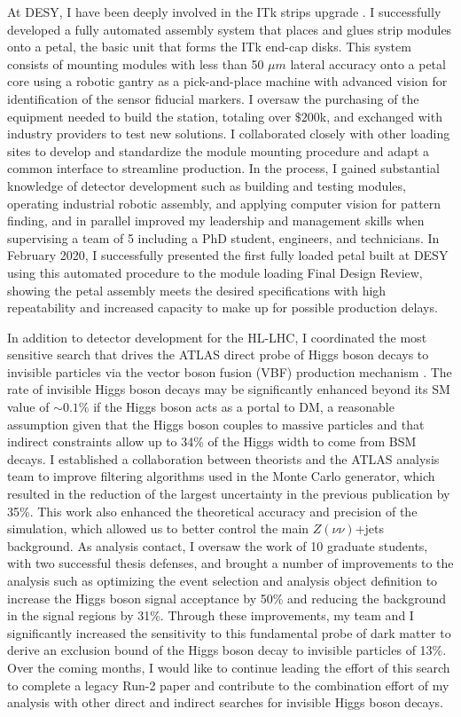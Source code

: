 \documentclass[a4paper]{article}
\begin{document}
At DESY, I have been deeply involved in the ITk strips upgrade \cite{ITKstrips}. I successfully developed a fully automated assembly system that places and glues strip modules onto a petal, the basic unit that forms the ITk end-cap disks. This system consists of mounting modules with less than 50 $\mu m$ lateral accuracy onto a petal core using a robotic gantry as a pick-and-place machine with advanced vision for identification of the sensor fiducial markers. I oversaw the purchasing of the equipment needed to build the station, totaling over $\$200$k, and exchanged with industry providers to test new solutions. I collaborated closely with other loading sites to develop and standardize the module mounting procedure and adapt a common interface to streamline production. In the process, I gained substantial knowledge of detector development such as building and testing modules, operating industrial robotic assembly, and applying computer vision for pattern finding, and in parallel improved my leadership and management skills when supervising a team of 5 including a PhD student, engineers, and technicians. In February 2020, I successfully presented the first fully loaded petal built at DESY using this automated procedure to the module loading Final Design Review, showing the petal assembly meets the desired specifications with high repeatability and increased capacity to make up for possible production delays.

\bigskip

In addition to detector development for the HL-LHC, I coordinated the most sensitive search that drives the ATLAS direct probe of Higgs boson decays to invisible particles via the vector boson fusion (VBF) production mechanism \cite{vbfMET_CONF2020}. The rate of invisible Higgs boson decays may be significantly enhanced beyond its SM value of $\sim0.1\%$ if the Higgs boson acts as a portal to DM, a reasonable assumption given that the Higgs boson couples to massive particles and that indirect constraints allow up to 34\% of the Higgs width to come from BSM decays.
I established a collaboration between theorists and the ATLAS analysis team to improve filtering algorithms used in the Monte Carlo generator, which resulted in the reduction of the largest uncertainty in the previous publication by 35\%. This work also enhanced the theoretical accuracy and precision of the simulation, which allowed us to better control the main $Z\left(\nu\nu\right)$+jets background. As analysis
contact, I oversaw the work of 10 graduate students, with two successful thesis defenses, and brought a number of improvements to the analysis such as optimizing the event selection and analysis object definition to increase the Higgs boson signal acceptance by 50\% and reducing the background in the signal regions by 31\%. Through these improvements, my team and I significantly increased the sensitivity to this fundamental probe of dark matter to derive an exclusion bound of the Higgs boson decay to invisible particles of 13\%. Over the coming months, I would like to continue leading the effort of this search to complete a legacy Run-2 paper and contribute to the combination effort of my analysis with other direct and indirect searches for invisible Higgs boson decays.
\end{document}
